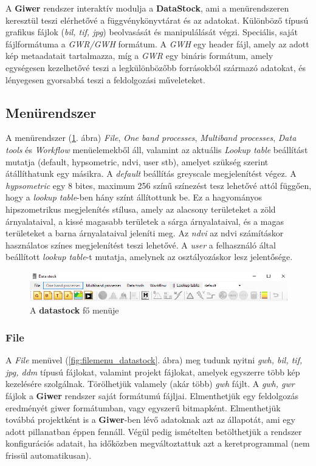 \documentclass[a4paper,12pt]{article}
\begin{document}
A \textbf{Giwer} rendszer interaktív modulja a \textbf{DataStock}, ami a menürendszeren keresztül teszi elérhetővé a függvénykönyvtárat és az adatokat. Különböző típusú grafikus fájlok (\textit{bil, tif, jpg}) beolvasását és manipulálását végzi. Speciális, saját fájlformátuma a \textit{GWR/GWH} formátum. A \textit{GWH} egy header fájl, amely az adott kép metaadatait tartalmazza, míg a \textit{GWR} egy bináris formátum, amely egységesen kezelhetővé teszi a legkülönbözőbb forrásokból származó adatokat, és lényegesen gyorsabbá teszi a feldolgozási műveleteket.

\subsection{Menürendszer}

A menürendszer (\ref{fig:datastock_fomenu}. ábra) \textit{File}, \textit{One band processes}, \textit{Multiband processes}, \textit{Data tools} és \textit{Workflow} menüelemekből áll, valamint  az aktuális \textit{Lookup table} beállítást mutatja (default, hypsometric, ndvi, user stb), amelyet szükség szerint átállíthatunk egy másikra. A \textit{default} beállítás greyscale megjelenítést végez. A \textit{hypsometric} egy 8 bites, maximum 256 színű színezést tesz lehetővé attól függően, hogy a \textit{lookup table}-ben hány színt állítottunk be. Ez a hagyományos hipszometrikus megjelenítés stílusa, amely az alacsony területeket a zöld árnyalataival, a kissé magasabb területek a sárga árnyalataival, és a magas területeket a barna árnyalataival jeleníti meg. Az \textit{ndvi} az ndvi számításkor használatos színes megjelenítést teszi lehetővé. A \textit{user} a felhasználó által beállított \textit{lookup table}-t mutatja, amelynek az osztályozáskor lesz jelentősége.

\begin{figure}
	\centering
	\includegraphics[width=14cm]{datastock_fomenu.png}
	\caption{A \textbf{datastock} fő menüje}
	\label{fig:datastock_fomenu}
\end{figure}

\subsubsection{File}

A \textit{File} menüvel (\ref{fig:filemenu_datastock}. ábra) meg tudunk nyitni \textit{gwh, bil, tif, jpg, ddm} típusú fájlokat, valamint projekt fájlokat, amelyek egyszerre több kép kezelésére szolgálnak. Törölhetjük valamely (akár több) \textit{gwh} fájlt. A \textit{gwh, gwr} fájlok a \textbf{Giwer} rendszer saját formátumú fájljai. Elmenthetjük egy feldolgozás eredményét giwer formátumban, vagy egyszerű bitmapként. Elmenthetjük továbbá projektként is a \textbf{Giwer}-ben lévő adatoknak azt az állapotát, ami egy adott pillanatban éppen fennáll. Végül pedig ismételten betölthetjük a rendszer konfigurációs adatait, ha időközben megváltoztattuk azt a keretprogrammal (nem frissül automatikusan).
\end{document}
